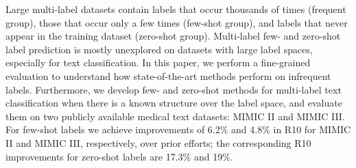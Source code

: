 Large multi-label datasets contain labels that occur thousands of times (frequent group), those that occur only a few times (few-shot group), and labels that never appear in the training dataset (zero-shot group). Multi-label few- and zero-shot label prediction is mostly unexplored on datasets with large label spaces, especially for text classification. In this paper, we perform a fine-grained evaluation to understand how state-of-the-art methods perform on infrequent labels. Furthermore, we develop few- and zero-shot methods for multi-label text classification when there is a known structure over the label space, and evaluate them on two publicly available medical text datasets: MIMIC II and MIMIC III. For few-shot labels we achieve improvements of 6.2\% and 4.8\% in R\@10 for MIMIC II and MIMIC III, respectively, over prior efforts; the corresponding R\@10 improvements for zero-shot labels are 17.3\% and 19\%.
